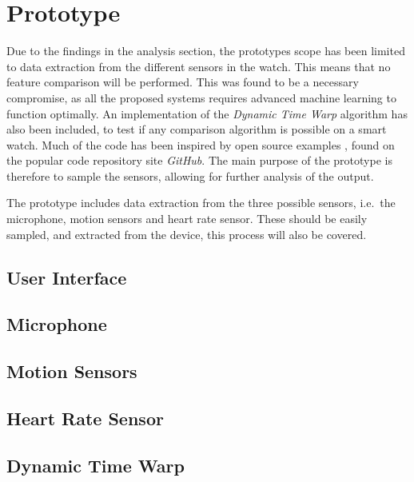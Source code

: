\section{Prototype}
Due to the findings in the analysis section, the prototypes scope has been
limited to data extraction from the different sensors in the watch. This means
that no feature comparison will be performed. This was found to be a necessary
compromise, as all the proposed systems requires advanced machine learning to
function optimally. An implementation of the \textit{Dynamic Time Warp}
algorithm has also been included, to test if any comparison algorithm is
possible on a smart watch. Much of the code has been inspired by open source
examples \cite{watchosheartratesamplerepo} \cite{healthkitheartrateexporter} 
\cite{watchossampler}, found on the popular code repository site \textit{GitHub}.
The main purpose of the prototype is therefore to sample the sensors, allowing
for further analysis of the output.

The prototype includes data extraction from the three possible sensors,
    i.e.\ the microphone, motion sensors and heart rate sensor. These should be
easily sampled, and extracted from the device, this process will also be
covered. 

\subsection{User Interface}

\subsection{Microphone}

\subsection{Motion Sensors}

\subsection{Heart Rate Sensor}

\subsection{Dynamic Time Warp}

